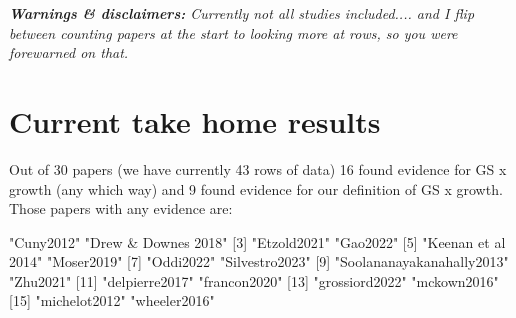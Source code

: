 \documentclass[11pt]{article}
\begin{document}
\renewcommand{\refname}{\CHead{}}

\iffalse
\title{Do growing season length and growth relate? \\ And if not, why not? \\ And if we're not sure, why is that?}
\author{Team Grephon}
\date{\today}
\maketitle
\fi 
\emph{{\bf Warnings \& disclaimers:}
Currently not all studies included.... and I flip between counting papers at the start to looking more at rows, so you were forewarned on that. }

\section{Current take home results}


Out of 30 papers (we have currently 43 rows of data) 16 found evidence for GS x growth (any which way) and  9 found evidence for our definition of GS x growth. Those papers with any evidence are:

\begin{Schunk}
\begin{Soutput}
 [1] "Cuny2012"                 "Drew & Downes 2018"      
 [3] "Etzold2021"               "Gao2022"                 
 [5] "Keenan et al 2014"        "Moser2019"               
 [7] "Oddi2022"                 "Silvestro2023"           
 [9] "Soolananayakanahally2013" "Zhu2021"                 
[11] "delpierre2017"            "francon2020"             
[13] "grossiord2022"            "mckown2016"              
[15] "michelot2012"             "wheeler2016"             
\end{Soutput}
\end{Schunk}
\end{document}
